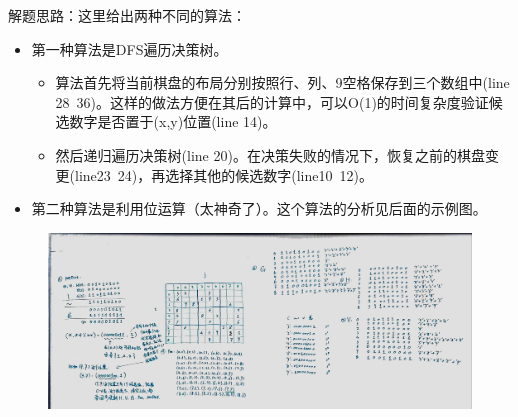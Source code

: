 \documentclass[a4paper,10pt]{article}
\begin{document}
\begin{CJK*}{UTF8}{gbsn}
\noindent 解题思路：这里给出两种不同的算法：
\begin{itemize}
    \item 第一种算法是DFS遍历决策树。
        \begin{itemize}
            \item 算法首先将当前棋盘的布局分别按照行、列、9空格保存到三个数组中(line 28~36)。这样的做法方便在其后的计算中，可以O(1)的时间复杂度验证候选数字是否置于(x,y)位置(line 14)。
            \item 然后递归遍历决策树(line 20)。在决策失败的情况下，恢复之前的棋盘变更(line23~24)，再选择其他的候选数字(line10~12)。
        \end{itemize}
    \item 第二种算法是利用位运算（太神奇了）。这个算法的分析见后面的示例图。
\end{itemize}
\end{CJK*}

\begin{figure}[h]
    \includegraphics[width=1\textwidth]{leetcode37-2.jpg}
    \centering\\
\end{figure}
\end{document}
